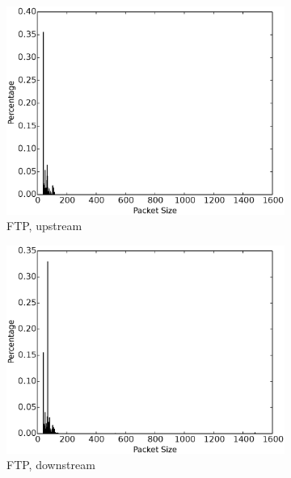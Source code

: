 \begin{figure}
\begin{subfigure}{.24\linewidth}
\includegraphics[width=\linewidth]{image/ftp_pkt_size_upstream.eps}
\caption{FTP, upstream}
\label{fig:ftp_pkt_size_upstream}
\end{subfigure}
\begin{subfigure}{.24\linewidth}
\centering
\includegraphics[width=\linewidth]{image/ftp_pkt_size_downstream.eps}
\caption{FTP, downstream}
\label{fig:ftp_pkt_size_downstream}
\end{subfigure}
\begin{subfigure}{.24\linewidth}
\centering

\end{subfigure}
\end{figure}
